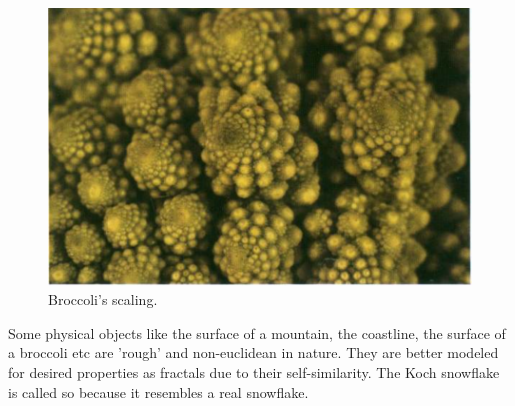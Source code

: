 \begin{figure}[h!]
  \includegraphics[width=\linewidth]{Pictures/broccoli_zoomed.png}
  \caption{Broccoli's scaling.}
  \label{fig:broccoli_zoomed}
\end{figure}
Some physical objects like the surface of a mountain, the coastline, the surface
of a broccoli etc are 'rough' and non-euclidean in nature. They are better
modeled for desired properties as fractals due to their self-similarity. The
Koch snowflake is called so because it resembles a real snowflake.
